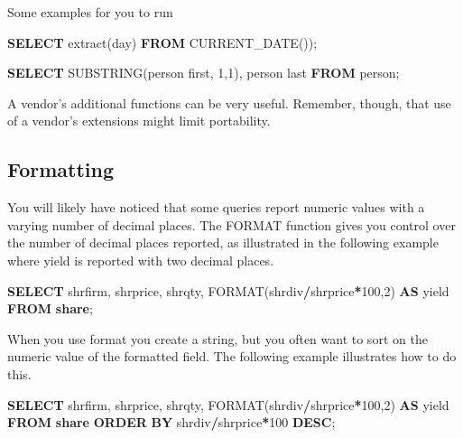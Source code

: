 \documentclass[
]{article}
\newenvironment{Shaded}{\begin{snugshade}}{\end{snugshade}}
\newcommand{\DataTypeTok}[1]{\textcolor[rgb]{0.13,0.29,0.53}{#1}}
\newcommand{\DecValTok}[1]{\textcolor[rgb]{0.00,0.00,0.81}{#1}}
\newcommand{\FunctionTok}[1]{\textcolor[rgb]{0.00,0.00,0.00}{#1}}
\newcommand{\KeywordTok}[1]{\textcolor[rgb]{0.13,0.29,0.53}{\textbf{#1}}}
\newcommand{\NormalTok}[1]{#1}
\newcommand{\OperatorTok}[1]{\textcolor[rgb]{0.81,0.36,0.00}{\textbf{#1}}}
\begin{document}
Some examples for you to run

\begin{Shaded}
\begin{Highlighting}[]
\KeywordTok{SELECT} \FunctionTok{extract}\NormalTok{(}\DataTypeTok{day}\NormalTok{) }\KeywordTok{FROM} \FunctionTok{CURRENT\_DATE}\NormalTok{());}
\end{Highlighting}
\end{Shaded}

\begin{Shaded}
\begin{Highlighting}[]
\KeywordTok{SELECT}\NormalTok{ SUBSTRING(\textasciigrave{}person first\textasciigrave{}, }\DecValTok{1}\NormalTok{,}\DecValTok{1}\NormalTok{), \textasciigrave{}person last\textasciigrave{} }\KeywordTok{FROM}\NormalTok{ person;}
\end{Highlighting}
\end{Shaded}

A vendor's additional functions can be very useful. Remember, though,
that use of a vendor's extensions might limit portability.

\hypertarget{formatting}{%
\subsection*{Formatting}\label{formatting}}

You will likely have noticed that some queries report numeric values
with a varying number of decimal places. The FORMAT function gives you
control over the number of decimal places reported, as illustrated in
the following example where yield is reported with two decimal places.

\begin{Shaded}
\begin{Highlighting}[]
\KeywordTok{SELECT}\NormalTok{ shrfirm, shrprice, shrqty, FORMAT(shrdiv}\OperatorTok{/}\NormalTok{shrprice}\OperatorTok{*}\DecValTok{100}\NormalTok{,}\DecValTok{2}\NormalTok{)}
  \KeywordTok{AS}\NormalTok{ yield}
    \KeywordTok{FROM} \KeywordTok{share}\NormalTok{;}
\end{Highlighting}
\end{Shaded}

When you use format you create a string, but you often want to sort on
the numeric value of the formatted field. The following example
illustrates how to do this.

\begin{Shaded}
\begin{Highlighting}[]
\KeywordTok{SELECT}\NormalTok{ shrfirm, shrprice, shrqty, FORMAT(shrdiv}\OperatorTok{/}\NormalTok{shrprice}\OperatorTok{*}\DecValTok{100}\NormalTok{,}\DecValTok{2}\NormalTok{)}
  \KeywordTok{AS}\NormalTok{ yield }\KeywordTok{FROM} \KeywordTok{share}
      \KeywordTok{ORDER} \KeywordTok{BY}\NormalTok{ shrdiv}\OperatorTok{/}\NormalTok{shrprice}\OperatorTok{*}\DecValTok{100} \KeywordTok{DESC}\NormalTok{;}
\end{Highlighting}
\end{Shaded}
\end{document}
